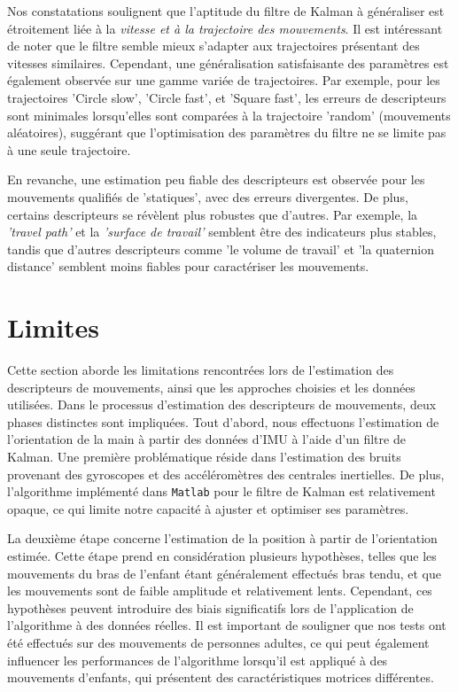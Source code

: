 \documentclass[8pt]{article}
\begin{document}
Nos constatations soulignent que l'aptitude du filtre de Kalman à généraliser est étroitement liée à la \textit{vitesse et à la trajectoire des mouvements}. Il est intéressant de noter que le filtre semble mieux s'adapter aux trajectoires présentant des vitesses similaires. Cependant, une généralisation satisfaisante des paramètres est également observée sur une gamme variée de trajectoires. Par exemple, pour les trajectoires 'Circle slow', 'Circle fast', et 'Square fast', les erreurs de descripteurs sont minimales lorsqu'elles sont comparées à la trajectoire 'random' (mouvements aléatoires), suggérant que l'optimisation des paramètres du filtre ne se limite pas à une seule trajectoire.

En revanche, une estimation peu fiable des descripteurs est observée pour les mouvements qualifiés de 'statiques', avec des erreurs divergentes. De plus, certains descripteurs se révèlent plus robustes que d'autres. Par exemple, la \textit{'travel path'} et la \textit{'surface de travail'} semblent être des indicateurs plus stables, tandis que d'autres descripteurs comme 'le volume de travail' et 'la quaternion distance' semblent moins fiables pour caractériser les mouvements.
                 
                         
\newpage
\section{Limites}
\label{limites}
Cette section aborde les limitations rencontrées lors de l'estimation des descripteurs de mouvements, ainsi que les approches choisies et les données utilisées. Dans le processus d'estimation des descripteurs de mouvements, deux phases distinctes sont impliquées. Tout d'abord, nous effectuons l'estimation de l'orientation de la main à partir des données d'IMU à l'aide d'un filtre de Kalman. Une première problématique réside dans l'estimation des bruits provenant des gyroscopes et des accéléromètres des centrales inertielles. De plus, l'algorithme implémenté dans \texttt{Matlab} pour le filtre de Kalman est relativement opaque, ce qui limite notre capacité à ajuster et optimiser ses paramètres.

La deuxième étape concerne l'estimation de la position à partir de l'orientation estimée. Cette étape prend en considération plusieurs hypothèses, telles que les mouvements du bras de l'enfant étant généralement effectués bras tendu, et que les mouvements sont de faible amplitude et relativement lents. Cependant, ces hypothèses peuvent introduire des biais significatifs lors de l'application de l'algorithme à des données réelles. Il est important de souligner que nos tests ont été effectués sur des mouvements de personnes adultes, ce qui peut également influencer les performances de l'algorithme lorsqu'il est appliqué à des mouvements d'enfants, qui présentent des caractéristiques motrices différentes. 
\newpage
\end{document}
